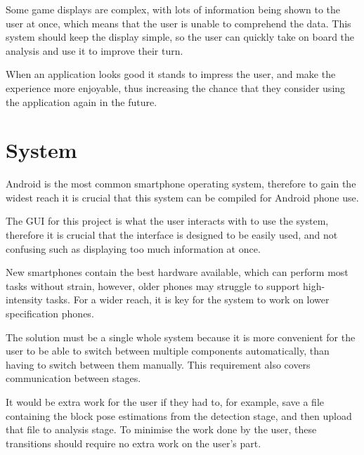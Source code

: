 \begin{enumerate}
Some game displays are complex, with lots of information being shown to the user at once, which means that the user is unable to comprehend the data. This system should keep the display simple, so the user can quickly take on board the analysis and use it to improve their turn.

When an application looks good it stands to impress the user, and make the experience more enjoyable, thus increasing the chance that they consider using the application again in the future.

\section{System}

Android is the most common smartphone operating system, therefore to gain the widest reach it is crucial that this system can be compiled for Android phone use.

The GUI for this project is what the user interacts with to use the system, therefore it is crucial that the interface is designed to be easily used, and not confusing such as displaying too much information at once.

New smartphones contain the best hardware available, which can perform most tasks without strain, however, older phones may struggle to support high-intensity tasks. For a wider reach, it is key for the system to work on lower specification phones.

The solution must be a single whole system because it is more convenient for the user to be able to switch between multiple components automatically, than having to switch between them manually. This requirement also covers communication between stages.

It would be extra work for the user if they had to, for example, save a file containing the block pose estimations from the detection stage, and then upload that file to analysis stage. To minimise the work done by the user, these transitions should require no extra work on the user's part.


\end{enumerate}
